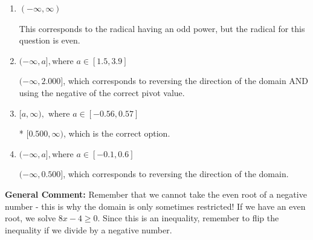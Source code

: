 \documentclass{extbook}[14pt]
\begin{document}
\begin{enumerate}
{\begin{enumerate}[label=\Alph*.]
$[2.000, \infty)$, which corresponds to using the negative of the correct pivot value.
\item \( (-\infty, \infty) \)

This corresponds to the radical having an odd power, but the radical for this question is even.
\item \( (-\infty, a], \text{where } a \in [1.5, 3.9] \)

$(-\infty, 2.000]$, which corresponds to reversing the direction of the domain AND using the negative of the correct pivot value.
\item \( [a, \infty), \text{ where } a \in [-0.56, 0.57] \)

* $[0.500, \infty)$, which is the correct option.
\item \( (-\infty, a], \text{where } a \in [-0.1, 0.6] \)

 $(-\infty, 0.500]$, which corresponds to reversing the direction of the domain.
\end{enumerate}

\textbf{General Comment:} Remember that we cannot take the even root of a negative number - this is why the domain is only sometimes restricted! If we have an even root, we solve $8 x - 4 \geq 0$. Since this is an inequality, remember to flip the inequality if we divide by a negative number.
}
\end{enumerate}
\end{document}
